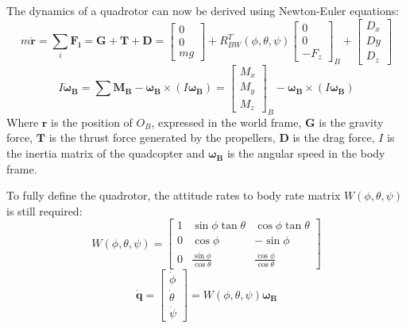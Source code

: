 \documentclass[a4paper, 12pt]{report}
\begin{document}
The dynamics of a quadrotor can now be derived using Newton-Euler equations:
\[ m\boldsymbol{\ddot r} =  \sum_i \boldsymbol{F_i} = \boldsymbol{G} + \boldsymbol{T} + \boldsymbol{D} = \begin{bmatrix}  0\\ 0\\ mg \end{bmatrix} + R_{BW}^T(\phi, \theta, \psi) \begin{bmatrix}  0\\ 0\\ -F_z \end{bmatrix}_B + \begin{bmatrix}  D_x\\ Dy\\ D_z \end{bmatrix}\]
\[ I\boldsymbol{\dot \omega_B} =  \sum \boldsymbol{M_B} - \boldsymbol{\omega_B}  \times (I \boldsymbol{\omega_B} )=  
\begin{bmatrix}  M_{x}\\ M_{y}\\ M_{z} \end{bmatrix}_B - \boldsymbol{\omega_B}  \times (I \boldsymbol{\omega_B}) \]
Where $\boldsymbol{r}$ is the position of $O_B$, expressed in the world frame,  $\boldsymbol{G}$ is the gravity force, $\boldsymbol{T}$ is the thrust force generated by the propellers, $\boldsymbol{D}$ is the drag force, $I$  is the inertia matrix of the quadcopter and $\boldsymbol{\omega_B}$ is the angular speed in the body frame.

To fully define the quadrotor, the attitude rates to body rate matrix $W(\phi,\theta,\psi)$ is still required: %
\[ W(\phi,\theta,\psi) = \begin{bmatrix}  1 & \sin\phi \tan\theta  & \cos\phi \tan\theta \\ 0 & \cos\phi  &-\sin\phi  \\ 0 & \frac{\sin\phi }{\cos\theta } & \frac{\cos\phi }{\cos\theta } \end{bmatrix}\]
\[ \boldsymbol{ \dot q} = \begin{bmatrix} \dot \phi \\ \dot \theta\\ \dot \psi \end{bmatrix} = W(\phi,\theta,\psi) \boldsymbol{\omega_B}\]
\end{document}
